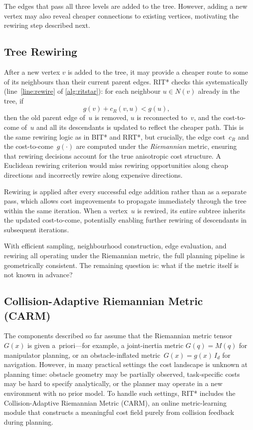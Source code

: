 \documentclass[journal]{IEEEtran}
\begin{document}
The edges that pass all three levels are added to the tree.
However, adding a new vertex may also reveal cheaper connections
to existing vertices, motivating the rewiring step described next.


\subsection{Tree Rewiring}\label{sec:rewire}

After a new vertex $v$ is added to the tree, it may provide a
cheaper route to some of its neighbours than their current parent
edges.
RIT* checks this systematically
(line~\ref{line:rewire} of \cref{alg:ritstar}): for each
neighbour $u \in N(v)$ already in the tree, if
\begin{equation}\label{eq:rewire}
  g(v) + c_R(v, u) < g(u),
\end{equation}
then the old parent edge of~$u$ is removed, $u$ is reconnected
to~$v$, and the cost-to-come of~$u$ and all its descendants is
updated to reflect the cheaper path.
This is the same rewiring logic as in BIT* and RRT*, but crucially,
the edge cost~$c_R$ and the cost-to-come~$g(\cdot)$ are computed
under the \emph{Riemannian} metric, ensuring that rewiring decisions
account for the true anisotropic cost structure.
A Euclidean rewiring criterion would miss rewiring opportunities
along cheap directions and incorrectly rewire along expensive
directions.

Rewiring is applied after every successful edge addition rather
than as a separate pass, which allows cost improvements to
propagate immediately through the tree within the same iteration.
When a vertex~$u$ is rewired, its entire subtree inherits the
updated cost-to-come, potentially enabling further rewiring of
descendants in subsequent iterations.

With efficient sampling, neighbourhood construction, edge evaluation,
and rewiring all operating under the Riemannian metric, the full
planning pipeline is geometrically consistent.
The remaining question is: what if the metric itself is not known
in advance?


\subsection{Collision-Adaptive Riemannian Metric (CARM)}\label{sec:carm}

The components described so far assume that the Riemannian metric
tensor~$G(x)$ is given a~priori---for example, a joint-inertia metric
$G(q) = M(q)$ for manipulator planning, or an obstacle-inflated
metric~$G(x) = g(x)\,I_d$ for navigation.
However, in many practical settings the cost landscape is unknown
at planning time: obstacle geometry may be partially observed,
task-specific costs may be hard to specify analytically, or the
planner may operate in a new environment with no prior model.
To handle such settings, RIT* includes the Collision-Adaptive
Riemannian Metric (CARM), an online metric-learning module that
constructs a meaningful cost field purely from collision feedback
during planning.
\end{document}
